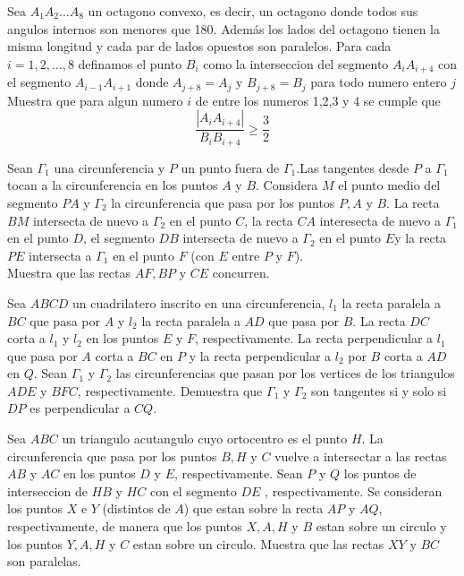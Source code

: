 \documentclass[11pt]{scrartcl}
\begin{document}
\begin{problem}
[2013/6] Sea $A_1A_2\ldots A_8$ un octagono convexo, es decir, un octagono donde todos sus angulos internos son menores que 180. Además los lados del octagono tienen la misma longitud y cada par de lados opuestos son paralelos. Para cada $i=1,2,\ldots,8$ definamos el punto $B_i$ como la interseccion  del segmento $A_iA_{i+4}$ con el segmento $A_{i-1}A_{i+1}$ donde $A_{j+8}=A_j$ y $B_{j+8}=B_j$ para todo numero entero $j$ Muestra que para algun numero $i$ de entre los numeros 1,2,3 y 4 se cumple que 
$$\frac{|A_iA_{i+4}|}{B_iB_{i+4}}\geq \frac 3 2$$
\end{problem}

\begin{problem}
[2014/3] Sean $\Gamma_1$ una circunferencia y $P$ un punto fuera de $\Gamma_1$.Las tangentes desde $P$ a $\Gamma_1$ tocan a la circunferencia en los puntos $A$ y $B$. Considera $M$ el punto medio del segmento $PA$ y $\Gamma_2$ la circunferencia que pasa por los puntos $P,A$  y $B$. La recta $BM$ intersecta de nuevo a $\Gamma_2$ en el punto $C$, la recta $CA$ interesecta de nuevo a $\Gamma_1$ en el punto $D$, el segmento $DB$ intersecta de nuevo a $\Gamma_2$ en el punto $E$y la recta $PE$ intersecta a $\Gamma_1$ en el punto $F$ (con $E$ entre $P$ y $F$). \\
Muestra que las rectas $AF,BP$ y $CE$ concurren.
\end{problem}

\begin{problem}
[2016/6] Sea $ABCD$ un cuadrilatero inscrito en una circunferencia, $l_1$ la recta paralela a $BC$ que pasa por $A$ y $l_2$ la recta paralela a $AD$ que pasa por $B$. La recta $DC$ corta a $l_1$ y $l_2$ en los puntos $E$ y $F$, respectivamente. La recta perpendicular a $l_1$ que pasa por $A$ corta a $BC$ en $P$ y la recta perpendicular a $l_2$ por $B$ corta a $AD$ en $Q$. Sean $\Gamma_1$ y $\Gamma_2$ las circunferencias que pasan por los vertices de los triangulos $ADE$ y $BFC$, respectivamente. Demuestra que $\Gamma_1$ y $\Gamma_2$ son tangentes si y solo si $DP$ es perpendicular a $CQ$. 
\end{problem}

\begin{problem}
[2017/3] Sea $ABC$ un triangulo acutangulo cuyo ortocentro es el punto $H$. La circunferencia que pasa por los puntos $B,H$ y $C$ vuelve  a intersectar a las rectas $AB$ y $AC$ en los puntos $D$ y $E$, respectivamente. Sean $P$ y $Q$ los puntos de interseccion de $HB$ y $HC$ con el segmento $DE$ , respectivamente. Se consideran los puntos $X$ e $Y$ (distintos de $A$) que estan sobre la recta $AP$ y $AQ$, respectivamente, de manera que los puntos $X,A,H$ y $B$ estan sobre un circulo y los puntos $Y,A,H$ y $C$ estan sobre un circulo. Muestra que las rectas $XY$ y $BC$ son paralelas.
\end{problem}
\end{document}

